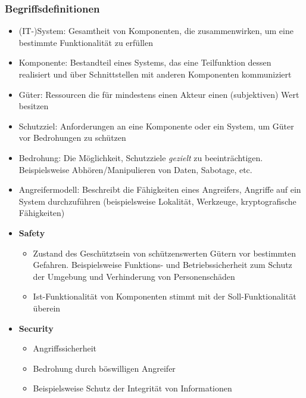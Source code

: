 \subsubsection{Begriffsdefinitionen}
\begin{itemize}
	\item (IT-)System: Gesamtheit von Komponenten, die zusammenwirken, um eine bestimmte Funktionalität zu erfüllen
	\item Komponente: Bestandteil eines Systems, das eine Teilfunktion dessen realisiert und über Schnittstellen mit anderen Komponenten kommuniziert
	\item Güter: Ressourcen die für mindestens einen Akteur einen (subjektiven) Wert besitzen
	\item Schutzziel: Anforderungen an eine Komponente oder ein System, um Güter vor Bedrohungen zu schützen
	\item Bedrohung: Die Möglichkeit, Schutzziele \textit{gezielt} zu beeinträchtigen. Beispielsweise Abhören/Manipulieren von Daten, Sabotage, etc.
	\item Angreifermodell: Beschreibt die Fähigkeiten eines Angreifers, Angriffe auf ein System durchzuführen (beispielsweise Lokalität, Werkzeuge, kryptografische Fähigkeiten)
	\item \textbf{Safety}
	\begin{itemize}
		\item Zustand des Geschütztsein von schützenswerten Gütern vor bestimmten Gefahren. Beispielsweise Funktions- und Betriebssicherheit zum Schutz der Umgebung und Verhinderung von Personenschäden
		\item Ist-Funktionalität von Komponenten stimmt mit der Soll-Funktionalität überein
	\end{itemize}
	\item \textbf{Security}
	\begin{itemize}
		\item Angriffssicherheit
		\item Bedrohung durch böswilligen Angreifer
		\item Beispielsweise Schutz der Integrität von Informationen
	\end{itemize}
\end{itemize}


